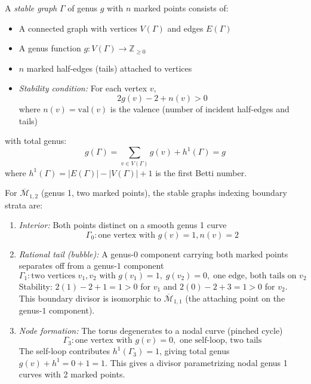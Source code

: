\begin{definition}\label{def:stable-graph}
A \emph{stable graph} $\Gamma$ of genus $g$ with $n$ marked points consists of:
\begin{itemize}
\item A connected graph with vertices $V(\Gamma)$ and edges $E(\Gamma)$
\item A genus function $g: V(\Gamma) \to \mathbb{Z}_{\geq 0}$
\item $n$ marked half-edges (tails) attached to vertices
\item \emph{Stability condition:} For each vertex $v$, 
\[2g(v) - 2 + n(v) > 0\]
where $n(v) = \text{val}(v)$ is the valence (number of incident half-edges and tails)
\end{itemize}
with total genus:
\[g(\Gamma) = \sum_{v \in V(\Gamma)} g(v) + h^1(\Gamma) = g\]
where $h^1(\Gamma) = |E(\Gamma)| - |V(\Gamma)| + 1$ is the first Betti number.
\end{definition}

\begin{example}[Stable graphs at genus 1, \texorpdfstring{$n=2$}{n=2}]\label{ex:stable-graphs-g1-n2}
For $\overline{\mathcal{M}}_{1,2}$ (genus 1, two marked points), the stable graphs indexing boundary strata are:

\begin{enumerate}
\item \emph{Interior:} Both points distinct on a smooth genus 1 curve
\[\Gamma_0: \text{one vertex with } g(v) = 1, n(v) = 2\]

\item \emph{Rational tail (bubble):} A genus-$0$ component carrying both marked points separates off from a genus-$1$ component
\[\Gamma_1: \text{two vertices } v_1, v_2 \text{ with } g(v_1) = 1,\; g(v_2) = 0,\; \text{one edge, both tails on } v_2\]
Stability: $2(1)-2+1 = 1 > 0$ for $v_1$ and $2(0)-2+3 = 1 > 0$ for $v_2$.  This boundary divisor is isomorphic to $\overline{\mathcal{M}}_{1,1}$ (the attaching point on the genus-$1$ component).

\item \emph{Node formation:} The torus degenerates to a nodal curve (pinched cycle)
\[\Gamma_3: \text{one vertex with } g(v) = 0, \text{ one self-loop, two tails}\]
The self-loop contributes $h^1(\Gamma_3) = 1$, giving total genus $g(v) + h^1 = 0 + 1 = 1$.
This gives a divisor parametrizing nodal genus 1 curves with 2 marked points.
\end{enumerate}
\end{example}

